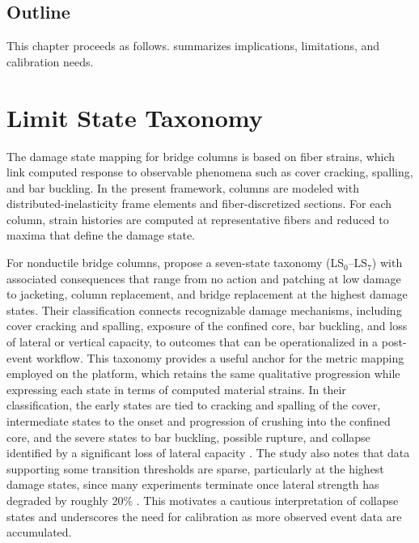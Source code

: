 \subsection{Outline}

This chapter proceeds as follows. 
 summarizes implications, limitations, and calibration needs.



\section{Limit State Taxonomy}\label{sec:t1-taxonomy}

The damage state mapping for bridge columns is based on fiber strains, which link computed response to observable phenomena such as cover cracking, spalling, and bar buckling. 
In the present framework, columns are modeled with distributed-inelasticity frame elements and fiber-discretized sections. 
For each column, strain histories are computed at representative fibers and reduced to maxima that define the damage state.


For nonductile bridge columns, \citet{zhou2022capacitya} propose a seven-state taxonomy (LS$_0$--LS$_7$) with associated consequences that range from no action and patching at low damage to jacketing, column replacement, and bridge replacement at the highest damage states. 
Their classification connects recognizable damage mechanisms, including cover cracking and spalling, exposure of the confined core, bar buckling, and loss of lateral or vertical capacity, to outcomes that can be operationalized in a post-event workflow. 
This taxonomy provides a useful anchor for the metric mapping employed on the \gls{platform}, which retains the same qualitative progression while expressing each state in terms of computed material strains. 
In their classification, the early states are tied to cracking and spalling of the cover, intermediate states to the onset and progression of crushing into the confined core, and the severe states to bar buckling, possible rupture, and collapse identified by a significant loss of lateral capacity \citep{zhou2022capacitya}. 
The study also notes that data supporting some transition thresholds are sparse, particularly at the highest damage states, since many experiments terminate once lateral strength has degraded by roughly 20\% \citep{zhou2022capacitya}. 
This motivates a cautious interpretation of collapse states and underscores the need for calibration as more observed event data are accumulated.

